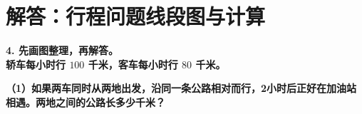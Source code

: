 

\newpage

\section{解答：行程问题线段图与计算}

\vspace{0.4cm}

\noindent\textbf{4. 先画图整理，再解答。}\\
\textbf{轿车每小时行 $100$ 千米，客车每小时行 $80$ 千米。}

\vspace{0.4cm}

\noindent\textbf{（1）如果两车同时从两地出发，沿同一条公路相对而行，2小时后正好在加油站相遇。两地之间的公路长多少千米？}

\vspace{0.8cm}

